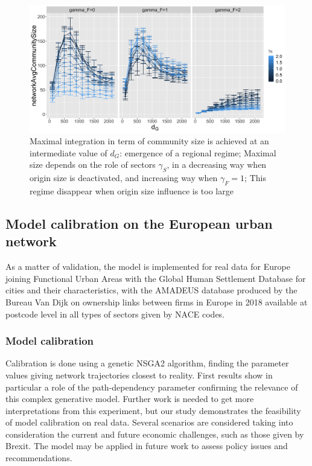 \documentclass[11pt]{article}
\begin{document}
\begin{figure}
    \includegraphics[width=\textwidth]{figures/networkAvgCommunitySize_countryGravityDecay2100_gammaDestination0_facetwrapgammaOrigin_colorgammaSectors.png}
	\caption{Maximal integration in term of community size is achieved at an intermediate value of $d_G$: emergence of a regional regime; Maximal size depends on the role of sectors $\gamma_S$, in a decreasing way when origin size is deactivated, and increasing way when $\gamma_F=1$; This regime disappear when origin size influence is too large}
\end{figure}






\subsection{Model calibration on the European urban network}


As a matter of validation, the model is implemented for real data for Europe joining Functional Urban Areas with the Global Human Settlement Database for cities and their characteristics, with the AMADEUS database produced by the Bureau Van Dijk on ownership links between firms in Europe in 2018 available at postcode level in all types of sectors given by NACE codes.



\subsubsection{Model calibration}

Calibration is done using a genetic NSGA2 algorithm, finding the parameter values giving network trajectories closest to reality. First results show in particular a role of the path-dependency parameter confirming the relevance of this complex generative model. Further work is needed to get more interpretations from this experiment, but our study demonstrates the feasibility of model calibration on real data. Several scenarios are considered taking into consideration the current and future economic challenges, such as those given by Brexit. The model may be applied in future work to assess policy issues and recommendations.
\end{document}
